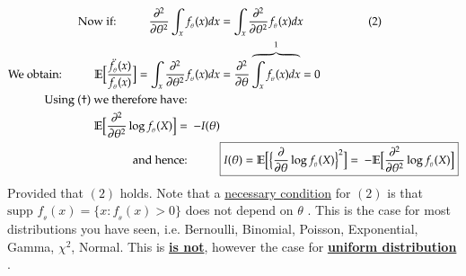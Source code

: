 \documentclass[14pt,twoside,a4paper,fleqn]{article}
\theoremstyle{plain}
\begin{document}
\begin{equation*}
\begin{split}
		\text{Now if:\tab}\frac{\partial^2}{\partial\theta^2}\int_x f_{_\theta}(x)dx &= \int_x\frac{\partial^2}{\partial\theta^2}f_{_\theta}(x)dx\tab[2cm] (2)\\
		\text{We obtain:\tab}\mathbb{E}\big[\frac{\ddot{f}_{_\theta}(x)}{f_{_\theta}(x)}\big] = \int_x\frac{\partial^2}{\partial\theta^2}f_{_\theta}(x)dx &= \frac{\partial^2}{\partial\theta}\overbrace{\int_x f_{_\theta}(x)dx}^{1} = 0\\
		\text{Using $(\dagger)$ we therefore have:\tab}&\\
		\mathbb{E}\big[\frac{\partial^2}{\partial\theta^2}\log{f_{_\theta}(X)}\big] =\ - I(\theta)&\\
		\text{and hence:\tab}&\boxed{I(\theta) = \mathbb{E}\big[\big\{\frac{\partial}{\partial\theta}\log{f_{_\theta}(X)}\big\}^2\big] =\ -\mathbb{E}\big[\frac{\partial^2}{\partial\theta^2}\log{f_{_\theta}(X)}\big]}
\end{split}
\end{equation*}
Provided that $(2)$ holds. Note that a \underline{necessary condition} for $(2)$ is that \mbox{$\text{supp }f_{_\theta}(x) = \{x: f_{_\theta}(x) > 0\}$} does not depend on $\theta$ . This is the case for most distributions you have seen, i.e. Bernoulli, Binomial, Poisson, Exponential, Gamma, $\chi^2$, Normal. This is \underline{\textbf{is not}}, however the case for \textbf{\underline{uniform distribution}} .
\end{document}
